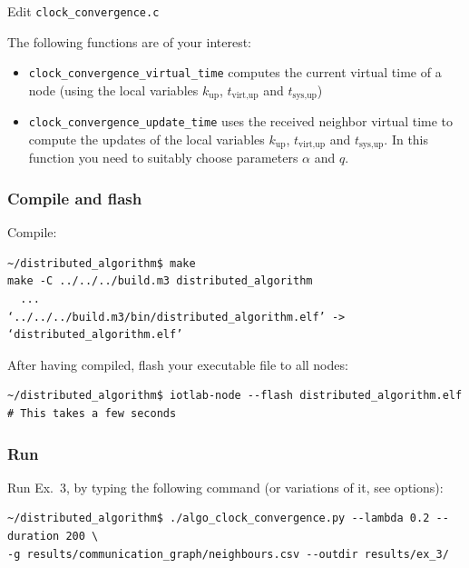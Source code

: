 \documentclass[oneside]{article}
\begin{document}
Edit \verb=clock_convergence.c=

The following functions are of your interest:
\begin{itemize}
	\item \verb=clock_convergence_virtual_time= computes the current virtual time of a node
        (using the local variables $k_{\text{up}}$, $t_{\text{virt},\text{up}}$ and $t_{\text{sys},\text{up}}$)
	\item \verb=clock_convergence_update_time= uses the received neighbor virtual time
        to compute the updates of the local variables
        $k_{\text{up}}$, $t_{\text{virt},\text{up}}$ and $t_{\text{sys},\text{up}}$.
        In this function you need to suitably choose parameters $\alpha$ and $q$.
\end{itemize}

\subsubsection{Compile and flash}

Compile:
    \begin{verbatim}~/distributed_algorithm$ make
make -C ../../../build.m3 distributed_algorithm
  ...
‘../../../build.m3/bin/distributed_algorithm.elf’ -> ‘distributed_algorithm.elf’
\end{verbatim}

After having compiled, flash your executable file to all nodes:
    \begin{verbatim}~/distributed_algorithm$ iotlab-node --flash distributed_algorithm.elf
# This takes a few seconds
\end{verbatim}

\subsubsection{Run} %

Run Ex.~3, by typing the following command (or variations of it, see options):

\begin{verbatim}
~/distributed_algorithm$ ./algo_clock_convergence.py --lambda 0.2 --duration 200 \
-g results/communication_graph/neighbours.csv --outdir results/ex_3/
\end{verbatim}
\end{document}

